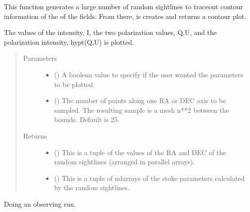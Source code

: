 \documentclass[letterpaper,10pt,english]{sphinxmanual}
\begin{document}
\begin{fulllineitems}
\begin{fulllineitems}
This function generates a large number of random sightlines to
traceout contour information of the of the fields. From
there, is creates and returns a contour plot.

The values of the intensity, I, the two polarization values, Q,U, and
the polarization intensity, hypt(Q,U) is plotted.
\begin{quote}\begin{description}
\item[{Parameters}] \leavevmode\begin{itemize}
\item {} 
 () \textendash{} A boolean value to specify if the user wanted the parameters to be
plotted.

\item {} 
 () \textendash{} The number of points along one RA or DEC axis to be sampled. The
resulting sample is a mesh n**2 between the bounds. Default is 25.

\end{itemize}

\item[{Returns}] \leavevmode
\begin{itemize}
\item {} 
 () \textendash{} This is a tuple of the values of the RA and DEC of the random
sightlines (arranged in parallel arrays).

\item {} 
 () \textendash{} This is a tuple of ndarrays of the stoke parameters calculated by
the random sightlines.

\end{itemize}


\end{description}\end{quote}

\end{fulllineitems}


\begin{fulllineitems}
\label{\detokenize{model_observing:model_observing.ObservingRun.__init__}}
Doing an observing run.


\end{fulllineitems}
\end{fulllineitems}
\end{document}
